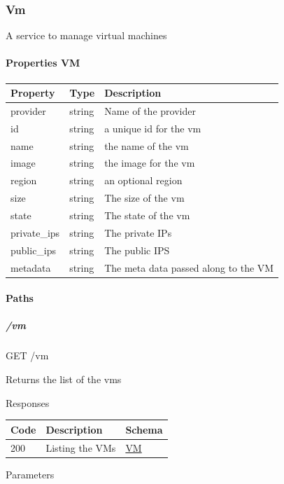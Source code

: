 \documentclass[9pt,]{article}
\let\oldparagraph\paragraph
\renewcommand{\paragraph}[1]{\oldparagraph{#1}\mbox{}}
\let\oldsubparagraph\subparagraph
\renewcommand{\subparagraph}[1]{\oldsubparagraph{#1}\mbox{}}
\begin{document}
\hypertarget{vm}{%
\subsubsection{Vm}\label{vm}}

A service to manage virtual machines

\hypertarget{properties-vm}{%
\paragraph{Properties VM}\label{properties-vm}}

\begin{longtable}[]{@{}lll@{}}
\toprule
Property & Type & Description\tabularnewline
\midrule
\endhead
provider & string & Name of the provider\tabularnewline
id & string & a unique id for the vm\tabularnewline
name & string & the name of the vm\tabularnewline
image & string & the image for the vm\tabularnewline
region & string & an optional region\tabularnewline
size & string & The size of the vm\tabularnewline
state & string & The state of the vm\tabularnewline
private\_ips & string & The private IPs\tabularnewline
public\_ips & string & The public IPS\tabularnewline
metadata & string & The meta data passed along to the VM\tabularnewline
\bottomrule
\end{longtable}

\hypertarget{paths-15}{%
\paragraph{Paths}\label{paths-15}}

\hypertarget{vm-1}{%
\subparagraph{/vm}\label{vm-1}}

GET /vm

Returns the list of the vms

Responses

\begin{longtable}[]{@{}lll@{}}
\toprule
Code & Description & Schema\tabularnewline
\midrule
\endhead
200 & Listing the VMs & \protect\hyperlink{vm}{VM}\tabularnewline
\bottomrule
\end{longtable}

Parameters
\end{document}
